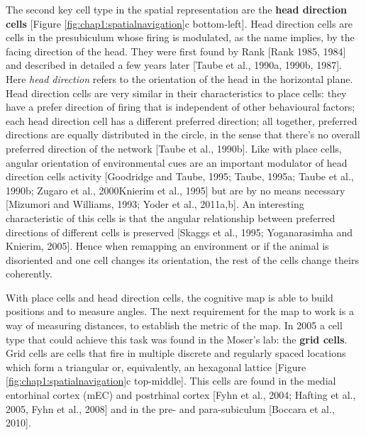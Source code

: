 The second key cell type in the spatial representation are the \textbf{head direction cells} [Figure \ref{fig:chap1:spatialnavigation}c bottom-left].  
Head direction cells are cells in the presubiculum whose firing is modulated, as the name implies, by the facing direction of the head.
They were first found by Rank [Rank 1985, 1984] and described in detailed a few years later [Taube et al., 1990a, 1990b, 1987].
Here \textit{head direction} refers to the orientation of the head in the horizontal plane.
Head direction cells are very similar in their characteristics to place cells: they have a prefer direction of firing that is independent of other behavioural factors; each head direction cell has a different preferred direction; all together, preferred directions are equally distributed in the circle, in the sense that there's no overall preferred direction of the network [Taube et al., 1990b].
Like with place cells, angular orientation of environmental cues are an important modulator of head direction cells activity [Goodridge and Taube, 1995; Taube, 1995a; Taube et al., 1990b; Zugaro et al., 2000Knierim et al., 1995] but are by no means necessary [Mizumori and Williams, 1993; Yoder et al., 2011a,b].
An interesting characteristic of this cells is that the angular relationship between preferred directions of different cells is preserved [Skaggs et al., 1995; Yoganarasimha and Knierim, 2005].
Hence when remapping an environment or if the animal is disoriented and one cell changes its orientation, the rest of the cells change theirs coherently.

With place cells and head direction cells, the cognitive map is able to build positions and to measure angles. 
The next requirement for the map to work is a way of measuring distances, to establish the metric of the map.
In 2005 a cell type that could achieve this task was found in the Moser's lab: the \textbf{grid cells}. 
Grid cells are cells that fire in multiple discrete and regularly spaced locations which form a triangular or, equivalently, an hexagonal lattice [Figure \ref{fig:chap1:spatialnavigation}c top-middle]. 
This cells are found in the medial entorhinal cortex (mEC) and postrhinal cortex [Fyhn et al., 2004; Hafting et al., 2005, Fyhn et al., 2008] and in the pre- and para-subiculum [Boccara et al., 2010]. 

